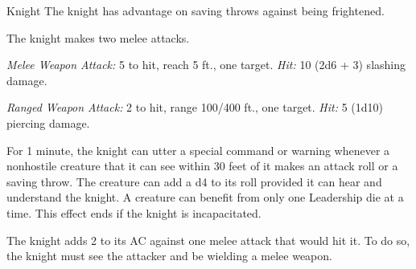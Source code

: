 \documentclass[10pt,a4paper,twoside,bg=print,twocolumn,openany,nodeprecatedcode]{dndbook}
\begin{document}
\begin{DndMonster}[float=t]{Knight}
\DndMonsterBasics[
armor-class = {18 (\textit{plate armor})},
hit-points = {\DndDice{8d8 + 16}},
speed = {30 ft.}
]
\DndMonsterAbilityScores[
 str = 16,
 dex = 11,
 con = 14,
 int = 11,
 wis = 11,
 cha = 15
]
\DndMonsterDetails[
saving-throws = {Con +4, Wis +2},
languages = {any one language (usually Common)},
challenge = 3,
]
The knight has advantage on saving throws against being frightened.

The knight makes two melee attacks.

\textsl{Melee Weapon Attack:} 5 to hit, reach 5 ft., one target. \textsl{Hit:} 10 (2d6 + 3) slashing damage.

\textsl{Ranged Weapon Attack:} 2 to hit, range 100/400 ft., one target. \textsl{Hit:} 5 (1d10) piercing damage.

For 1 minute, the knight can utter a special command or warning whenever a nonhostile creature that it can see within 30 feet of it makes an attack roll or a saving throw. The creature can add a d4 to its roll provided it can hear and understand the knight. A creature can benefit from only one Leadership die at a time. This effect ends if the knight is incapacitated.

The knight adds 2 to its AC against one melee attack that would hit it. To do so, the knight must see the attacker and be wielding a melee weapon.

\end{DndMonster}


\clearpage
\end{document}
